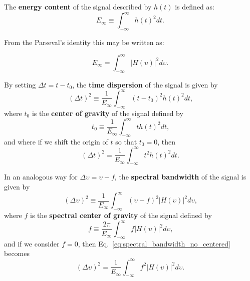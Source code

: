 The \textbf{energy content} of the signal described by $h(t)$ is defined as:
\begin{equation}\label{eq:energy_content_time}
    E_{\infty} \equiv \int_{-\infty}^{\infty}  h(t)^2 dt \text{.}
\end{equation}


From the Parseval's identity this may be written as:

\begin{equation}\label{eq:energy_content_frequency}
    E_{\infty} =  \int_{-\infty}^{\infty} |H(\upsilon)|^2 d\upsilon \text{.}
\end{equation}

By setting $\Delta t = t - t_0$, the \textbf{time dispersion} of the signal is given by
\begin{equation}\label{eq:time_dispersion_no_centered}
    (\Delta t)^2 \equiv \frac{1}{E_{\infty}} \int_{-\infty}^{\infty} (t-t_{0})^2 h(t)^2 dt \text{,}
\end{equation}
where $t_0$ is the \textbf{center of gravity} of the signal defined by
\begin{equation}\label{eq:center_of_gravity}
    t_0 \equiv \frac{1}{E_{\infty}} \int_{-\infty}^{\infty} t h(t)^2 dt \text{,}
\end{equation}
and where if we shift the origin of $t$ so that $t_{0}=0$, then
\begin{equation}\label{eq:time_dispersion}
    (\Delta t)^2 = \frac{1}{E_{\infty}} \int_{-\infty}^{\infty} t^2 h(t)^2 dt \text{.}
\end{equation}

In an analogous way for $\Delta \upsilon = \upsilon - f$, the \textbf{spectral bandwidth} of the signal is given by
\begin{equation}\label{eq:spectral_bandwidth_no_centered}
    (\Delta \upsilon)^2 \equiv \frac{1}{E_{\infty}} \int_{-\infty}^{\infty} (\upsilon-f)^2 |H(\upsilon)|^2 d\upsilon \text{,}
\end{equation}
where $f$ is the \textbf{spectral center of gravity} of the signal defined by
\begin{equation}\label{eq:spectral_center_of_gravity}
    f \equiv  \frac{2 \pi}{E_{\infty}} \int_{-\infty}^{\infty} f |H(\upsilon)|^2 d\upsilon \text{,}
\end{equation}
and if we consider $f=0$, then Eq.\ \eqref{eq:spectral_bandwidth_no_centered} becomes
\begin{equation}\label{eq:spectral_bandwidth}
    (\Delta \upsilon)^2 = \frac{1}{E_{\infty}} \int_{-\infty}^{\infty} f^2 |H(\upsilon)|^2 d\upsilon \text{.} 
\end{equation}

